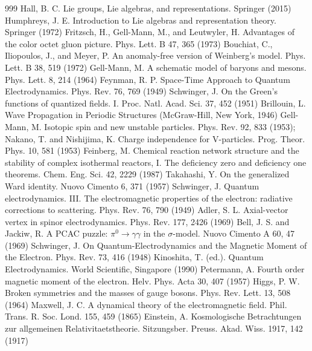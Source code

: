 \begin{thebibliography}{999}
 Hall, B. C. Lie groups, Lie algebras, and representations. Springer (2015)
 Humphreys, J. E. Introduction to Lie algebras and representation theory. Springer (1972)
 Fritzsch, H., Gell-Mann, M., and Leutwyler, H. Advantages of the color octet gluon picture. Phys. Lett. B 47, 365 (1973)
 Bouchiat, C., Iliopoulos, J., and Meyer, P. An anomaly-free version of Weinberg's model. Phys. Lett. B 38, 519 (1972)
 Gell-Mann, M. A schematic model of baryons and mesons. Phys. Lett. 8, 214 (1964)
 Feynman, R. P. Space-Time Approach to Quantum Electrodynamics. Phys. Rev. 76, 769 (1949)
 Schwinger, J. On the Green's functions of quantized fields. I. Proc. Natl. Acad. Sci. 37, 452 (1951)
 Brillouin, L. Wave Propagation in Periodic Structures (McGraw-Hill, New York, 1946)
 Gell-Mann, M. Isotopic spin and new unstable particles. Phys. Rev. 92, 833 (1953); Nakano, T. and Nishijima, K. Charge independence for V-particles. Prog. Theor. Phys. 10, 581 (1953)
 Feinberg, M. Chemical reaction network structure and the stability of complex isothermal reactors, I. The deficiency zero and deficiency one theorems. Chem. Eng. Sci. 42, 2229 (1987)
 Takahashi, Y. On the generalized Ward identity. Nuovo Cimento 6, 371 (1957)
 Schwinger, J. Quantum electrodynamics. III. The electromagnetic properties of the electron: radiative corrections to scattering. Phys. Rev. 76, 790 (1949)
 Adler, S. L. Axial-vector vertex in spinor electrodynamics. Phys. Rev. 177, 2426 (1969)
 Bell, J. S. and Jackiw, R. A PCAC puzzle: $\pi^0\to\gamma\gamma$ in the $\sigma$-model. Nuovo Cimento A 60, 47 (1969)
 Schwinger, J. On Quantum-Electrodynamics and the Magnetic Moment of the Electron. Phys. Rev. 73, 416 (1948)
 Kinoshita, T. (ed.). Quantum Electrodynamics. World Scientific, Singapore (1990)
 Petermann, A. Fourth order magnetic moment of the electron. Helv. Phys. Acta 30, 407 (1957)
 Higgs, P. W. Broken symmetries and the masses of gauge bosons. Phys. Rev. Lett. 13, 508 (1964)
 Maxwell, J. C. A dynamical theory of the electromagnetic field. Phil. Trans. R. Soc. Lond. 155, 459 (1865)
 Einstein, A. Kosmologische Betrachtungen zur allgemeinen Relativitaetstheorie. Sitzungsber. Preuss. Akad. Wiss. 1917, 142 (1917)

\end{thebibliography}

